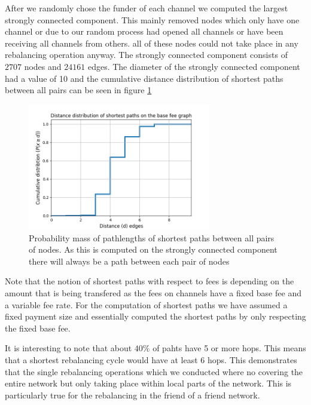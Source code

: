\documentclass[a4paper]{paper}
\begin{document}
After we randomly chose the funder of each channel we computed the largest strongly connected component.
This mainly removed nodes which only have one channel or due to our random process had opened all channels or have been receiving all channels from others.
all of these nodes could not take place in any rebalancing operation anyway.
The strongly connected component consists of $2707$ nodes and $24161$ edges.
The diameter of the strongly connected component had a value of 10 and the cumulative distance distribution of shortest paths between all pairs can be seen in figure \cref{fig:cumulative_distance}
\begin{figure}
 \centering
 \includegraphics[width=8cm]{code/vs/fig/cummulative_distance_distribution_lin_scale.png}
 \caption{Probability mass of pathlengths of shortest paths between all pairs of nodes. As this is computed on the strongly connected component there will always be a path between each pair of nodes}
 \label{fig:cumulative_distance}
\end{figure}
Note that the notion of shortest paths with respect to fees is depending on the amount that is being transfered as the fees on channels have a fixed base fee and a variable fee rate.
For the computation of shortest paths we have assumed a fixed payment size and essentially computed the shortest paths by only respecting the fixed base fee.

It is interesting to note that about $40\%$ of pahts have 5 or more hops.
This means that a shortest rebalancing cycle would have at least 6 hops.
This demonstrates that the single rebalancing operations which we conducted where no covering the entire network but only taking place within local parts of the network.
This is particularly true for the rebalancing in the friend of a friend network.
\end{document}
